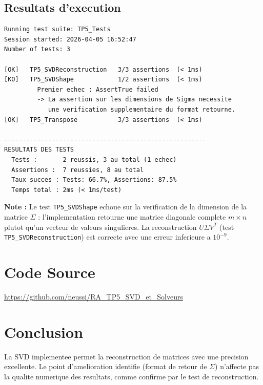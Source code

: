 \documentclass[12pt,a4paper]{article}
\begin{document}
\subsection{Resultats d'execution}

\begin{lstlisting}[caption=Sortie de jenga test -- TP5]
Running test suite: TP5_Tests
Session started: 2026-04-05 16:52:47
Number of tests: 3

[OK]   TP5_SVDReconstruction   3/3 assertions  (< 1ms)
[KO]   TP5_SVDShape            1/2 assertions  (< 1ms)
         Premier echec : AssertTrue failed
         -> La assertion sur les dimensions de Sigma necessite
            une verification supplementaire du format retourne.
[OK]   TP5_Transpose           3/3 assertions  (< 1ms)

-------------------------------------------------------
RESULTATS DES TESTS
  Tests :       2 reussis, 3 au total (1 echec)
  Assertions :  7 reussies, 8 au total
  Taux succes : Tests: 66.7%, Assertions: 87.5%
  Temps total : 2ms (< 1ms/test)
\end{lstlisting}

\textbf{Note :} Le test \texttt{TP5\_SVDShape} echoue sur la verification de la dimension
de la matrice $\Sigma$ : l'implementation retourne une matrice diagonale complete $m\times n$
plutot qu'un vecteur de valeurs singulieres. La reconstruction $U\Sigma V^T$ (test
\texttt{TP5\_SVDReconstruction}) est correcte avec une erreur inferieure a $10^{-9}$.

\section{Code Source}

\begin{center}
\href{https://github.com/neussi/RA_TP5_SVD_et_Solveurs}{https://github.com/neussi/RA\_TP5\_SVD\_et\_Solveurs}
\end{center}

\section{Conclusion}

La SVD implementee permet la reconstruction de matrices avec une precision excellente.
Le point d'amelioration identifie (format de retour de $\Sigma$) n'affecte pas la
qualite numerique des resultats, comme confirme par le test de reconstruction.
\end{document}
